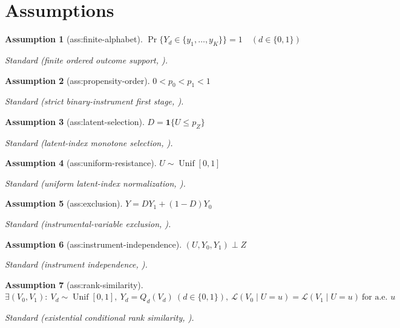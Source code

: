 \documentclass{article}
\newtheorem{assumption}{Assumption}
\begin{document}
\section{Assumptions}

\begin{assumption}[ass:finite-alphabet]\label{ass:finite-alphabet}
\(\Pr\{Y_d\in\{y_1,\ldots,y_K\}\}=1\quad(d\in\{0,1\})\)
\par\smallskip\noindent\emph{Standard} (finite ordered outcome support, \cite{Chesher2010DiscreteIV}).
\end{assumption}

\begin{assumption}[ass:propensity-order]\label{ass:propensity-order}
\(0<p_0<p_1<1\)
\par\smallskip\noindent\emph{Standard} (strict binary-instrument first stage, \cite{Marx2024SharpBounds}).
\end{assumption}

\begin{assumption}[ass:latent-selection]\label{ass:latent-selection}
\(D=\mathbf 1\{U\le p_Z\}\)
\par\smallskip\noindent\emph{Standard} (latent-index monotone selection, \cite{Marx2024SharpBounds}).
\end{assumption}

\begin{assumption}[ass:uniform-resistance]\label{ass:uniform-resistance}
\(U\sim\operatorname{Unif}[0,1]\)
\par\smallskip\noindent\emph{Standard} (uniform latent-index normalization, \cite{Marx2024SharpBounds}).
\end{assumption}

\begin{assumption}[ass:exclusion]\label{ass:exclusion}
\(Y=DY_1+(1-D)Y_0\)
\par\smallskip\noindent\emph{Standard} (instrumental-variable exclusion, \cite{Marx2024SharpBounds}).
\end{assumption}

\begin{assumption}[ass:instrument-independence]\label{ass:instrument-independence}
\((U,Y_0,Y_1)\perp Z\)
\par\smallskip\noindent\emph{Standard} (instrument independence, \cite{Marx2024SharpBounds}).
\end{assumption}

\begin{assumption}[ass:rank-similarity]\label{ass:rank-similarity}
\(\exists(V_0,V_1):\ V_d\sim\operatorname{Unif}[0,1],\ Y_d=Q_d(V_d)\ (d\in\{0,1\}),\ \mathcal L(V_0\mid U=u)=\mathcal L(V_1\mid U=u)\ \text{for a.e. }u\)
\par\smallskip\noindent\emph{Standard} (existential conditional rank similarity, \cite{Marx2024SharpBounds}).
\end{assumption}
\end{document}
